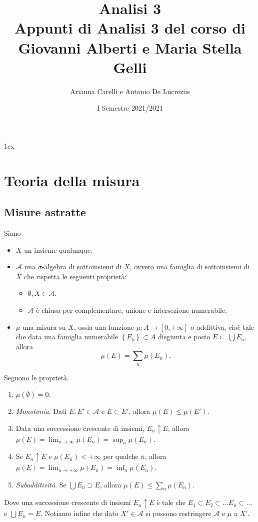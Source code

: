\documentclass[a4paper, 11pt]{report}
\title{{\Huge Analisi 3}\\{\small Appunti di Analisi 3 del corso di Giovanni Alberti e Maria Stella Gelli}}
\author{Arianna Carelli e Antonio De Lucreziis}
\date{I Semestre 2021/2021}
\begin{document}
%
%
\parskip 1ex
\setlength{\parindent}{0pt}

\maketitle

\tableofcontents
\newpage

\chapter{Teoria della misura}

\section{Misure astratte}
Siano
\begin{itemize}[label={}]
	\item $X$ un insieme qualunque.
	\item $\mathcal{A}$ una $\sigma$-algebra di sottoinsiemi di $X$, ovvero una famiglia di sottoinsiemi di $X$ che rispetta le seguenti proprietà:
		\begin{itemize}[label={--}]
			\item $\emptyset, X \in \mathcal{A}$.
			\item $\mathcal{A}$ è chiusa per complementare, unione e intersezione numerabile.
			\end{itemize}
	\item $\mu$ una misura su $X$, ossia una funzione $\mu \colon A \to [0,+\infty]$ $\sigma$-addittiva, cioè tale che data una famiglia numerabile $\left\{ E_k \right\} \subset A$ disgiunta e posto $E \coloneqq \bigcup E_n $, allora
	\[
		\mu(E) = \sum_{n} \mu (E_n).
	\] 
\end{itemize}
%
Seguono le proprietà.
\begin{enumerate}[label=(\roman*)]
	\item $\mu(\emptyset) = 0$.
	\item \textit{Monotonia}. Dati $E,E' \in \mathcal{A}$ e $E \subset E'$, allora $\mu(E) \leq \mu(E')$.
	\item Data una successione crescente di insiemi, $E_n \uparrow E$, allora $\mu(E) = \lim_{n \to \infty} \mu(E_n) = \sup_{n} \mu(E_n)$.
	\item Se $E_n \uparrow E$ e $\mu (E_{\bar{n}}) < +\infty$ per qualche $\bar{n}$, allora $\mu(E) = \lim_{n \to + \infty} \mu(E_n) = \inf_{n} \mu(E_n)$.
	\item \textit{Subadditività}. Se $\bigcup E_n \supset E$, allora $\mu(E) \leq \sum_{n}^{} \mu(E_n)$.
\end{enumerate}
%
Dove una successione crescente di insiemi $E_n \uparrow E$ è tale che $E_1 \subset E_2 \subset \ldots E_n \subset \ldots $ e $\bigcup E_n = E$.
%
Notiamo infine che dato $X' \in \mathcal{A}$ si possono restringere $\mathcal{A}$ e $\mu$ a $X'$.
%
\end{document}
